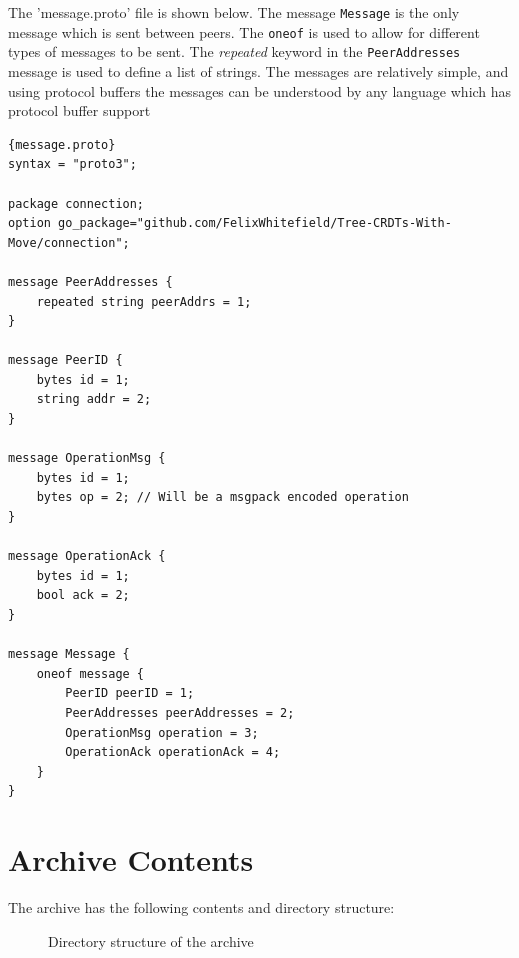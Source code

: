 \documentclass[12pt]{report}
\begin{document}
The 'message.proto' file is shown below. The message \texttt{Message} is the only message which is sent between peers. The \texttt{oneof} is used to allow for different types of messages to be sent. The \textit{repeated} keyword in the \texttt{PeerAddresses} message is used to define a list of strings. The messages are relatively simple, and using protocol buffers the messages can be understood by any language which has protocol buffer support 

\begin{lstlisting}[language=protobuf3, style=protobuf]{message.proto}
syntax = "proto3";

package connection;
option go_package="github.com/FelixWhitefield/Tree-CRDTs-With-Move/connection";

message PeerAddresses {
    repeated string peerAddrs = 1;
}

message PeerID {
    bytes id = 1;
    string addr = 2;
}

message OperationMsg {
    bytes id = 1; 
    bytes op = 2; // Will be a msgpack encoded operation
}

message OperationAck {
    bytes id = 1;
    bool ack = 2;
}

message Message {
    oneof message {
        PeerID peerID = 1;
        PeerAddresses peerAddresses = 2;
        OperationMsg operation = 3;
        OperationAck operationAck = 4;
    }
}
\end{lstlisting}

\chapter{Archive Contents}

The archive has the following contents and directory structure:
\begin{figure}[h]
    \caption{Directory structure of the archive}
\end{figure}


\end{document}
